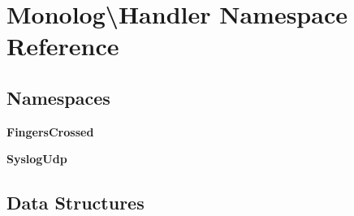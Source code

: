 \section{Monolog\textbackslash{}Handler Namespace Reference}
\label{namespace_monolog_1_1_handler}
\subsection*{Namespaces}
\begin{DoxyCompactItemize}
\item 
 {\bf Fingers\+Crossed}
\item 
 {\bf Syslog\+Udp}
\end{DoxyCompactItemize}
\subsection*{Data Structures}
